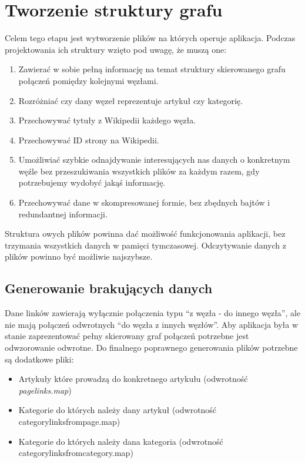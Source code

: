 \section{Tworzenie struktury grafu}
\label{sec:data-files}
Celem tego etapu jest wytworzenie plików na których operuje aplikacja. Podczas projektowania ich struktury wzięto pod uwagę, że muszą one:
\begin{enumerate}
    \item Zawierać w sobie pełną informację na temat struktury skierowanego grafu połączeń pomiędzy kolejnymi węzłami.
    \item Rozróżniać czy dany węzeł reprezentuje artykuł czy kategorię.
    \item Przechowywać tytuły z Wikipedii każdego węzła.
    \item Przechowywać ID strony na Wikipedii.
    \item Umożliwiać szybkie odnajdywanie interesujących nas danych o konkretnym węźle bez przeszukiwania wszystkich plików za każdym razem, gdy potrzebujemy wydobyć jakąś informację.
    \item Przechowywać dane w skompresowanej formie, bez zbędnych bajtów i redundantnej informacji.
\end{enumerate}

Struktura owych plików powinna dać możliwość funkcjonowania aplikacji, bez trzymania wszystkich danych w pamięci tymczasowej. Odczytywanie danych z plików powinno być możliwie najszybsze.

\subsection{Generowanie brakujących danych}
\label{sec:generating-missing-files}

Dane linków zawierają wyłącznie połączenia typu ``z węzła - do innego węzła'', ale nie mają połączeń odwrotnych ``do węzła z innych węzłów''. Aby aplikacja była w stanie zaprezentować pełny skierowany graf połączeń potrzebne jest odwzorowanie odwrotne.
Do finalnego poprawnego generowania plików potrzebne są dodatkowe pliki:
\begin{itemize}
    \item Artykuły które prowadzą do konkretnego artykułu (odwrotność \textit{pagelinks.map})
    \item Kategorie do których należy dany artykuł (odwrotność categorylinksfrompage.map)
    \item Kategorie do których należy dana kategoria (odwrotność categorylinksfromcategory.map)
\end{itemize}


